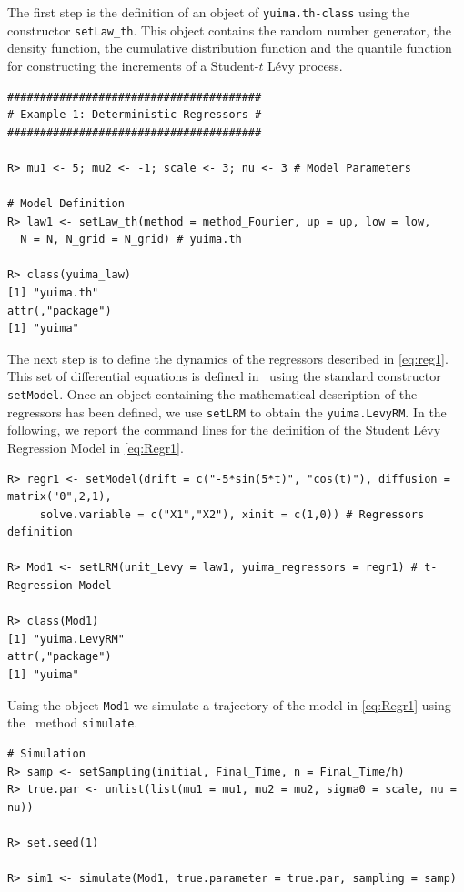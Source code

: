 The first step is the definition of an object of \texttt{yuima.th-class} using the constructor \texttt{setLaw\_th}.
This object contains the random number generator, the density function, the cumulative distribution function and the quantile function for constructing the increments of a Student-\(t\) Lévy process.

\begin{verbatim}
#######################################
# Example 1: Deterministic Regressors #
#######################################

R> mu1 <- 5; mu2 <- -1; scale <- 3; nu <- 3 # Model Parameters

# Model Definition
R> law1 <- setLaw_th(method = method_Fourier, up = up, low = low,
  N = N, N_grid = N_grid) # yuima.th

R> class(yuima_law)
[1] "yuima.th"
attr(,"package")
[1] "yuima"
\end{verbatim}

The next step is to define the dynamics of the regressors described in \eqref{eq:reg1}. This set of differential equations is defined in  ~using the standard constructor \texttt{setModel}. Once an object containing the mathematical description of the regressors has been defined, we use \texttt{setLRM} to obtain the \texttt{yuima.LevyRM}. In the following, we report the command lines for the definition of the Student Lévy Regression Model in \eqref{eq:Regr1}.

\begin{verbatim}
R> regr1 <- setModel(drift = c("-5*sin(5*t)", "cos(t)"), diffusion = matrix("0",2,1),
     solve.variable = c("X1","X2"), xinit = c(1,0)) # Regressors definition

R> Mod1 <- setLRM(unit_Levy = law1, yuima_regressors = regr1) # t-Regression Model

R> class(Mod1)
[1] "yuima.LevyRM"
attr(,"package")
[1] "yuima"
\end{verbatim}

Using the object \texttt{Mod1} we simulate a trajectory of the model in \eqref{eq:Regr1} using the  ~method \texttt{simulate}.

\begin{verbatim}
# Simulation
R> samp <- setSampling(initial, Final_Time, n = Final_Time/h)
R> true.par <- unlist(list(mu1 = mu1, mu2 = mu2, sigma0 = scale, nu = nu))

R> set.seed(1)

R> sim1 <- simulate(Mod1, true.parameter = true.par, sampling = samp)
\end{verbatim}

